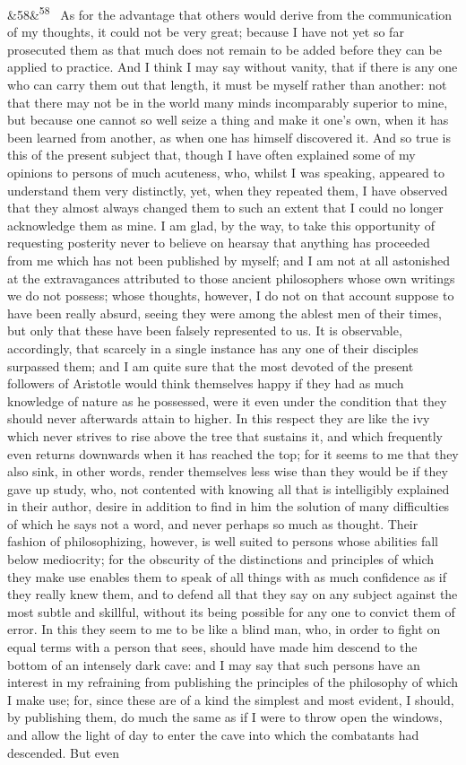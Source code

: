 \documentclass[12pt]{article}
\newcommand{\para}[1][]{\par\noindent\ifx&#1&\else\textsuperscript{\footnotesize #1}~\fi}
\begin{document}
\para[58] As for the advantage that others would derive from the communication of my thoughts, it could not be very great; because I have not yet so far prosecuted them as that much does not remain to be added before they can be applied to practice. And I think I may say without vanity, that if there is any one who can carry them out that length, it must be myself rather than another: not that there may not be in the world many minds incomparably superior to mine, but because one cannot so well seize a thing and make it one's own, when it has been learned from another, as when one has himself discovered it. And so true is this of the present subject that, though I have often explained some of my opinions to persons of much acuteness, who, whilst I was speaking, appeared to understand them very distinctly, yet, when they repeated them, I have observed that they almost always changed them to such an extent that I could no longer acknowledge them as mine. I am glad, by the way, to take this opportunity of requesting posterity never to believe on hearsay that anything has proceeded from me which has not been published by myself; and I am not at all astonished at the extravagances attributed to those ancient philosophers whose own writings we do not possess; whose thoughts, however, I do not on that account suppose to have been really absurd, seeing they were among the ablest men of their times, but only that these have been falsely represented to us. It is observable, accordingly, that scarcely in a single instance has any one of their disciples surpassed them; and I am quite sure that the most devoted of the present followers of Aristotle would think themselves happy if they had as much knowledge of nature as he possessed, were it even under the condition that they should never afterwards attain to higher. In this respect they are like the ivy which never strives to rise above the tree that sustains it, and which frequently even returns downwards when it has reached the top; for it seems to me that they also sink, in other words, render themselves less wise than they would be if they gave up study, who, not contented with knowing all that is intelligibly explained in their author, desire in addition to find in him the solution of many difficulties of which he says not a word, and never perhaps so much as thought. Their fashion of philosophizing, however, is well suited to persons whose abilities fall below mediocrity; for the obscurity of the distinctions and principles of which they make use enables them to speak of all things with as much confidence as if they really knew them, and to defend all that they say on any subject against the most subtle and skillful, without its being possible for any one to convict them of error. In this they seem to me to be like a blind man, who, in order to fight on equal terms with a person that sees, should have made him descend to the bottom of an intensely dark cave: and I may say that such persons have an interest in my refraining from publishing the principles of the philosophy of which I make use; for, since these are of a kind the simplest and most evident, I should, by publishing them, do much the same as if I were to throw open the windows, and allow the light of day to enter the cave into which the combatants had descended. But even 
\end{document}

